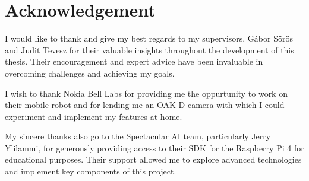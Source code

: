 \chapter{Acknowledgement} \label{acknowledgements}

I would like to thank and give my best regards to my supervisors, Gábor Sörös and Judit Tevesz for their valuable insights throughout the development of this thesis. Their encouragement and expert advice have been invaluable in overcoming challenges and achieving my goals.

I wish to thank Nokia Bell Labs for providing me the oppurtunity to work on their mobile robot and for lending me an OAK-D camera with which I could experiment and implement my features at home.

My sincere thanks also go to the Spectacular AI team, particularly Jerry Ylilammi, for generously providing access to their SDK for the Raspberry Pi 4 for educational purposes. Their support allowed me to explore advanced technologies and implement key components of this project.
